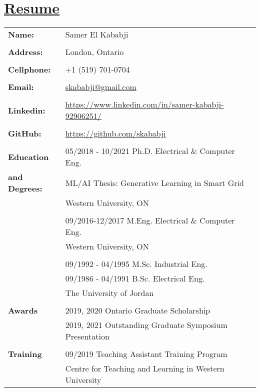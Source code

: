 \documentclass[11pt]{report}
\begin{document}
\section*{\textbf{\underline{Resume}}}
\begin{table}[!htbp]
\noindent
\begin{tabular}{@{}ll}
\textbf{Name:} & Samer El Kababji\\\\
\textbf{Address:} & London, Ontario\\\\
\textbf{Cellphone:} & +1 (519) 701-0704\\\\
\textbf{Email:} & \href{mailto:skababji@gmail.com}{skababji@gmail.com}\\\\
\textbf{Linkedin:} & \url{https://www.linkedin.com/in/samer-kababji-92906251/}\\\\
\textbf{GitHub:} & \url{https://github.com/skababji}\\\\
\textbf{Education}& 05/2018 - 10/2021 Ph.D. Electrical \& Computer Eng.\\
\textbf{and Degrees:}& ML/AI Thesis: Generative Learning in Smart Grid\\
& Western University, ON\\\\
& 09/2016-12/2017 M.Eng. Electrical \& Computer Eng.\\
& Western University, ON\\\\
& 09/1992 - 04/1995 M.Sc. Industrial Eng.\\
& 09/1986 - 04/1991 B.Sc. Electrical Eng.\\
& The University of Jordan\\\\
\textbf{Awards}& 2019, 2020 Ontario Graduate Scholarship\\
& 2019, 2021 Outstanding Graduate Symposium Presentation\\\\
\textbf{Training}
&09/2019 Teaching Assistant Training Program\\ 
& Centre for Teaching and Learning in Western University

\end{tabular}
\end{table}
\end{document}
